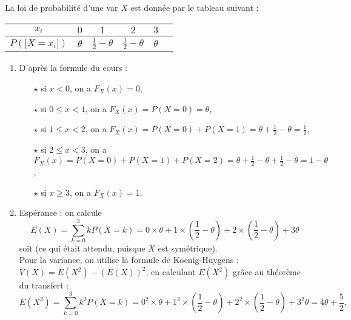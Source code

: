 \documentclass[a4paper, 11pt,reqno]{article}
\begin{document}
\begin{correction}  \;
	La loi de probabilit\'e d'une var $X$ est donn\'ee par le tableau
	suivant :\\\begin{center} \begin{tabular}{|c|c|c|c|c|c|} \hline $x_i$     & $0$      & $1$                  & $2$                  & $3$      \\
               \hline $P(\lbrack X=x_i\rbrack)$ & $\theta$ & $\frac{1}{2}-\theta$ & $\frac{1}{2}-\theta$ & $\theta$
               \\ \hline
		\end{tabular} \end{center}
	\begin{enumerate}
		\item D'apr\`es la formule du cours :
		      \begin{itemize}
			      \item[$\star$] si $x<0$, on a $F_X(x) = 0$,
			      \item[$\star$] si $0\leq x < 1$, on a $F_X(x) = P(X =0) = \theta$,
			      \item[$\star$] si $1\leq x < 2$, on a $F_X(x) = P(X=0)+P(X=1) = \theta + \frac{1}{2} -\theta = \frac{1}{2}$,
			      \item[$\star$] si $2\leq x < 3$, on a $F_X(x) =  P(X=0)+P(X=1)+P(X=2) =  \theta + \frac{1}{2} -\theta + \frac{1}{2} -\theta = 1-\theta$,
			      \item[$\star$] si $x\geq 3$, on a $F_X(x) = 1$.
		      \end{itemize}
		\item Esp\'erance : on calcule
		      $$E(X) = \sum\limits_{k=0}^3 k P(X=k) = 0 \times \theta + 1\times( \frac{1}{2} -\theta ) + 2\times( \frac{1}{2} -\theta ) + 3 \theta$$
		      soit  (ce qui \'etait attendu, puisque $X$ est sym\'etrique).\\
		      Pour la variance, on utilise la formule de Koenig-Huygens : $V(X) = E(X^2) - (E(X))^2$, en calculant $E(X^2)$ gr\^ace au th\'eor\`eme du transfert :
		      $$E(X^2) = \sum\limits_{k=0}^3 k^2 P(X=k) =  0^2 \times \theta + 1^2 \times( \frac{1}{2} -\theta ) + 2^2 \times( \frac{1}{2} -\theta ) + 3^2 \theta = 4\theta+\frac{5}{2}.$$

\end{enumerate}
\end{correction}
\end{document}
